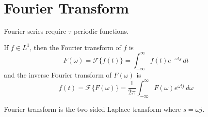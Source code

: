 \documentclass[11pt]{article}
\begin{document}
\section{Fourier Transform}
\label{sec:orgbc73cc3}
Fourier series require \(\tau\) periodic functions.

If \(f \in L^{1}\), then the Fourier transform of \(f\) is
$$
F(\omega) = \mathcal{F}\{ f(t) \} = \int_{-\infty}^{\infty} f(t) e^{-\omega t j} \, dt
$$
and the inverse Fourier transform of \(F(\omega)\) is
$$
f(t) = \mathcal{F}\{ F(\omega) \} = \frac{1}{2\pi} \int_{-\infty}^{\infty} F(\omega) e^{\omega t j}
\, d\omega
$$

Fourier transform is the two-sided Laplace transform where \(s = \omega j\).
\end{document}

